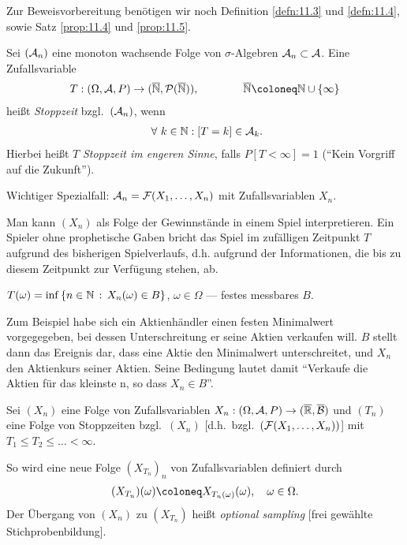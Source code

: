 Zur Beweisvorbereitung benötigen wir noch
Definition \ref{defn:11.3} und \ref{defn:11.4}, sowie Satz \ref{prop:11.4} und
\ref{prop:11.5}.

\begin{defn}
\label{defn:11.3}
Sei $({\AA }_{n})$ eine monoton wachsende Folge von $\sigma$-Algebren
${\AA}_{n}\subset {\AA}$. Eine Zufallsvariable
\begin{align*}
T : (\Omega, {\AA },P)\to (\overline{\N}, {\PP}(\overline{\N})),\qquad\qquad
\overline{\N}\defl \N\cup \setd{\infty}
\end{align*}
heißt \emph{Stoppzeit} bzgl.\ $({\AA}_{n})$, wenn
\begin{align*}
\forall {k\in \N} : [T=k]\in {\AA}_{k}.
\end{align*}
Hierbei heißt $T$ \emph{ Stoppzeit im engeren Sinne}, falls $P[T<\infty] =1$
(``Kein Vorgriff auf die Zukunft'').

Wichtiger Spezialfall: ${\AA}_{n} = {\FF} (X_{1},\ldots ,X_{n})$ mit
Zufallsvariablen $X_{n}$.\fishhere
\end{defn}

Man kann $(X_{n})$ als Folge der Gewinnstände in einem Spiel interpretieren.
Ein Spieler ohne prophetische Gaben bricht das Spiel im zufälligen Zeitpunkt
$T$ aufgrund des bisherigen Spielverlaufs, d.h. aufgrund der Informationen, die
bis zu diesem Zeitpunkt zur Verfügung stehen, ab.

\begin{bsp}
$T(\omega ) = \inf\setdef{n\in \N}{X_{n}(\omega ) \in B}$,
$\omega \in \Omega $ --- festes messbares $B$.

Zum Beispiel habe sich ein Aktienhändler einen festen Minimalwert vorgegegeben,
bei dessen Unterschreitung er seine Aktien verkaufen will. $B$ stellt dann das
Ereignis dar, dass eine Aktie den Minimalwert unterschreitet, und $X_n$ den
Aktienkurs seiner Aktien. Seine Bedingung lautet damit ``Verkaufe die Aktien für
das kleinste n, so dass $X_n\in B$''.\bsphere
\end{bsp}

\begin{defn}
\label{defn:11.4}
Sei $(X_{n})$ eine Folge von Zufallsvariablen $X_{n} : (\Omega, {\AA},P)\to
(\RA, \overline{\BB})$ und $(T_{n})$ eine Folge von Stoppzeiten bzgl.\
$(X_{n})$ [d.h.\ bzgl.\ $({\FF}(X_{1},\ldots ,X_{n}))$] mit $T_{1} \leq T_{2} \leq
\ldots < \infty$.

So wird eine neue Folge $(X_{T_{n}})_{n}$ von Zufallsvariablen definiert durch
\begin{align*}
(X_{T_{n}})(\omega ) \defl X_{T_{n}(\omega)} (\omega),\quad \omega \in
\Omega.
\end{align*}
Der Übergang von $(X_{n})$ zu $(X_{T_{n}})$ heißt \emph{optional sampling}
[frei gewählte Stichprobenbildung].\fishhere
\end{defn}

